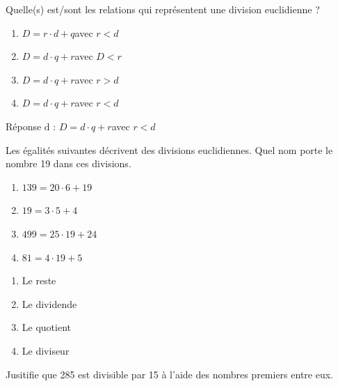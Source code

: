 \documentclass[../../syllabus_2.tex]{subfiles}
\begin{document}
\begin{exercise}
    Quelle(s) est/sont les relations qui représentent une division euclidienne ?
    \begin{enumerate}
        \item $D = r\cdot d + q$\qquad avec $r<d$
        \item $D = d\cdot q + r$\qquad avec $D<r$
        \item $D = d\cdot q + r$\qquad avec $r>d$
        \item $D = d\cdot q + r$\qquad avec $r<d$
    \end{enumerate}
\end{exercise}
\begin{solution}
    Réponse d : $D = d\cdot q + r$\qquad avec $r<d$
\end{solution}

\begin{exercise}
    Les égalités suivantes décrivent des divisions euclidiennes. Quel nom porte le nombre 19 dans ces divisions.
    \begin{enumerate}[cols=2]
        \item $139 = 20\cdot 6 + 19$
        \item $19 = 3\cdot 5 + 4$
        \item $499 = 25\cdot 19 + 24$
        \item $81 = 4\cdot 19 + 5$
    \end{enumerate}
\end{exercise}
\begin{solution}
    \begin{enumerate}
        \item Le reste
        \item Le dividende
        \item Le quotient
        \item Le diviseur
    \end{enumerate}
\end{solution}

\begin{exercise}
    Jusitifie que 285 est divisible par 15 à l'aide des nombres premiers entre eux.
\end{exercise}
\end{document}

